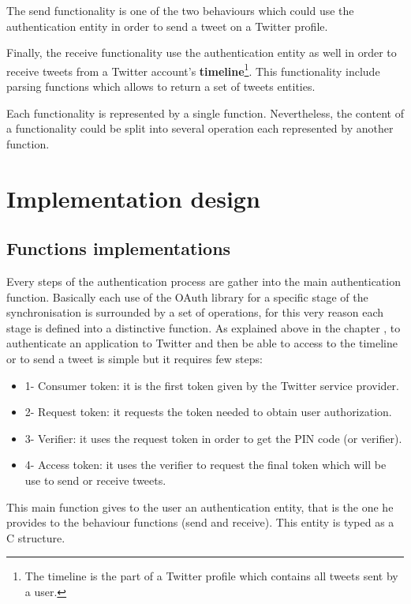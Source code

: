The send functionality is one of the two behaviours which could use the authentication entity in order to send a tweet on a Twitter profile.

Finally, the receive functionality use the authentication entity as well in order to receive tweets from a Twitter account's \textbf{timeline}\footnote{The timeline is the part of a Twitter profile which contains all tweets sent by a user.}. This functionality include parsing functions which allows to return a set of tweets entities. 

Each functionality is represented by a single function. Nevertheless, the content of a functionality could be split into several operation each represented by another function.



\section{Implementation design}


\subsection{Functions implementations}


\hspace{15mm}Every steps of the authentication process are gather into the main authentication function. Basically each use of the OAuth library for a specific stage of the synchronisation is surrounded by a set of operations, for this very reason each stage is defined into a distinctive function. As explained above in the chapter , to authenticate an application to Twitter and then be able to access to the timeline or to send a tweet is simple but it requires few steps:
\begin{itemize}
\item 1- Consumer token: it is the first token given by the Twitter service provider.
\item 2- Request token: it requests the token needed to obtain user authorization.
\item 3- Verifier: it uses the request token in order to get the PIN code (or verifier). 
\item 4- Access token: it uses the verifier to request the final token which will be use to send or receive tweets.
\end{itemize}
This main function gives to the user an authentication entity, that is the one he provides to the behaviour functions (send and receive). This entity is typed as a C structure.

